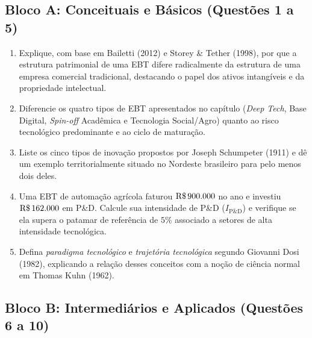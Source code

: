 \subsection*{Bloco A: Conceituais e Básicos (Questões 1 a 5)}

\begin{enumerate}[leftmargin=1.6em, itemsep=6pt]
  \item Explique, com base em Bailetti (2012) e Storey \& Tether (1998), por que a estrutura patrimonial de uma EBT difere radicalmente da estrutura de uma empresa comercial tradicional, destacando o papel dos ativos intangíveis e da propriedade intelectual.
  \espacoResolucao[1.8cm]

  \item Diferencie os quatro tipos de EBT apresentados no capítulo (\textit{Deep Tech}, Base Digital, \textit{Spin-off} Acadêmica e Tecnologia Social/Agro) quanto ao risco tecnológico predominante e ao ciclo de maturação.
  \espacoResolucao[1.8cm]

  \item Liste os cinco tipos de inovação propostos por Joseph Schumpeter (1911) e dê um exemplo territorialmente situado no Nordeste brasileiro para pelo menos dois deles.
  \espacoResolucao[1.8cm]

  \item Uma EBT de automação agrícola faturou $\text{R\$\,}{900.000}$ no ano e investiu $\text{R\$\,}{162.000}$ em P\&D. Calcule sua intensidade de P\&D ($I_{\text{P\&D}}$) e verifique se ela supera o patamar de referência de $5\%$ associado a setores de alta intensidade tecnológica.
  \espacoResolucao[1.8cm]

  \item Defina \textit{paradigma tecnológico} e \textit{trajetória tecnológica} segundo Giovanni Dosi (1982), explicando a relação desses conceitos com a noção de ciência normal em Thomas Kuhn (1962).
  \espacoResolucao[1.8cm]
\end{enumerate}

\subsection*{Bloco B: Intermediários e Aplicados (Questões 6 a 10)}

